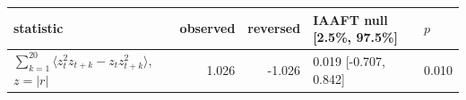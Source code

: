 \begin{tabular}{lrrll}\toprule statistic & observed & reversed & IAAFT null [2.5\%, 97.5\%] & $p$\\\midrule
$\sum_{k=1}^{20}\langle z_t^2z_{t+k}-z_tz_{t+k}^2\rangle$, $z=|r|$ & 1.026 & -1.026 & 0.019 [-0.707, 0.842] & 0.010\\
\bottomrule\end{tabular}
